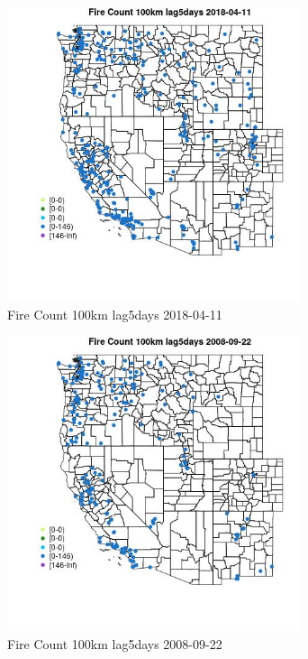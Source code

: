 \begin{figure} 
\centering  
\includegraphics[width=0.77\textwidth]{Code_Outputs/Report_ML_input_PM25_Step4_part_e_de_duplicated_aves_compiled_2019-05-18wNAs_MapObsFire_Count_100km_lag5days2018-04-11.jpg} 
\caption{\label{fig:Report_ML_input_PM25_Step4_part_e_de_duplicated_aves_compiled_2019-05-18wNAsMapObsFire_Count_100km_lag5days2018-04-11}Fire Count 100km lag5days 2018-04-11} 
\end{figure} 
 

\begin{figure} 
\centering  
\includegraphics[width=0.77\textwidth]{Code_Outputs/Report_ML_input_PM25_Step4_part_e_de_duplicated_aves_compiled_2019-05-18wNAs_MapObsFire_Count_100km_lag5days2008-09-22.jpg} 
\caption{\label{fig:Report_ML_input_PM25_Step4_part_e_de_duplicated_aves_compiled_2019-05-18wNAsMapObsFire_Count_100km_lag5days2008-09-22}Fire Count 100km lag5days 2008-09-22} 
\end{figure} 
 

